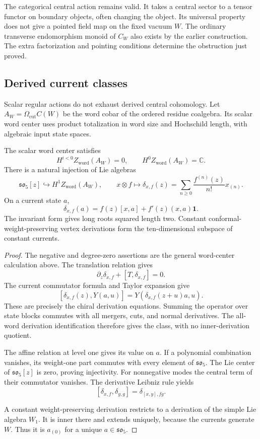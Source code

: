 The categorical central action remains valid.
It takes a central sector to a tensor functor on boundary
objects, often changing the object. Its universal property
does not give a pointed field map on the fixed vacuum $W$.
The ordinary transverse endomorphism monoid of $C_W$ also
exists by the earlier construction. The extra factorization
and pointing conditions determine the obstruction just proved.

\subsection{Derived current classes}

Scalar regular actions do not exhaust derived central
cohomology. Let $A_W=\Omega_{\mathrm{cut}}C(W)$ be the word
cobar of the ordered residue coalgebra. Its scalar word
center uses product totalization in word size and
Hochschild length, with algebraic input state spaces.

\begin{proposition}
\label{v4-arith:centers:prop:e6-derived}
The scalar word center satisfies
\[
 H^{i<0}Z_{\mathrm{word}}(A_W)=0,\qquad
 H^0Z_{\mathrm{word}}(A_W)=\mathbb C.
\]
There is a natural injection of Lie algebras
\[
 \mathfrak{so}_5[z]\hookrightarrow
 H^1Z_{\mathrm{word}}(A_W),
 \qquad
 x\otimes f\longmapsto
 \delta_{x,f}(z)=
 \sum_{n\geq0}\frac{f^{(n)}(z)}{n!}x_{(n)}.
\]
On a current state $a$,
\[
 \delta_{x,f}(a)=f(z)[x,a]+f'(z)(x,a)\mathbf1.
\]
The invariant form gives long roots squared length two.
Constant conformal-weight-preserving vertex derivations
form the ten-dimensional subspace of constant currents.
\end{proposition}

\begin{proof}
The negative and degree-zero assertions are the general
word-center calculation above.
The translation relation gives
\[
 \partial_z\delta_{x,f}+[T,\delta_{x,f}]=0.
\]
The current commutator formula and Taylor expansion give
\[
 [\delta_{x,f}(z),Y(a,u)]
 =Y(\delta_{x,f}(z+u)a,u).
\]
These are precisely the chiral derivation equations.
Summing the operator over state blocks commutes with
all mergers, cuts, and normal derivatives.
The all-word derivation identification therefore gives
the class, with no inner-derivation quotient.

The affine relation at level one gives its value on $a$.
If a polynomial combination vanishes, its weight-one
part commutes with every element of $\mathfrak{so}_5$.
The Lie center of $\mathfrak{so}_5[z]$ is zero, proving
injectivity. For nonnegative modes the central term of
their commutator vanishes. The derivative Leibniz rule yields
\[
 [\delta_{x,f},\delta_{y,g}]=\delta_{[x,y],fg}.
\]

A constant weight-preserving derivation restricts to a
derivation of the simple Lie algebra $W_1$.
It is inner there and extends uniquely, because the
currents generate $W$. Thus it is $a_{(0)}$ for a unique
$a\in\mathfrak{so}_5$.
\end{proof}

